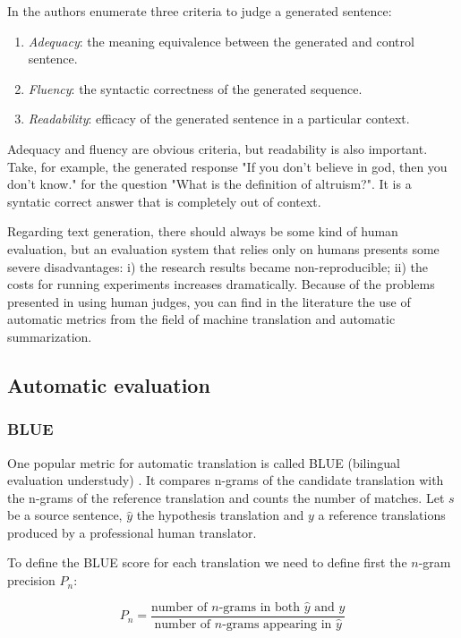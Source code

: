 In \cite{Stent} the authors enumerate three criteria to judge a generated sentence:

\begin{enumerate}
\item \textit{Adequacy}: the meaning equivalence between the generated and control sentence. 
\item \textit{Fluency}: the syntactic correctness of the generated sequence.
\item \textit{Readability}: efficacy of the generated sentence in a particular context.
\end{enumerate}

Adequacy and fluency are obvious criteria, but readability is also important. Take, for example, the generated response "If you don’t believe in god, then you don’t know." for the question "What is the definition of altruism?". It is a syntatic correct answer that is completely out of context.

Regarding text generation, there should always be some kind of human evaluation, but an evaluation system that relies only on humans presents some severe disadvantages: i) the research results became non-reproducible; ii) the costs for running experiments increases dramatically. Because of the problems presented in using human judges, you can find in the literature the use of automatic metrics from the field of machine translation and automatic summarization.


\subsection{Automatic evaluation}

\subsubsection{BLUE}

One popular metric for automatic translation is called BLUE (bilingual evaluation understudy) \cite{Papineni2001}. It compares n-grams of the candidate translation with the n-grams of the reference translation and counts the number of matches. Let $s$ be a source sentence, $\hat{y}$ the hypothesis translation and $y$ a reference translations produced by a professional human translator. 

To define the BLUE score for each translation we need to define first the $n$-gram precision $P_n$:

\begin{equation}
P_n = \frac{\text{number of } n\text{-grams in both } \hat{y} \text{ and } y}{\text{number of } n\text{-grams appearing in } \hat{y}}
\end{equation}    


